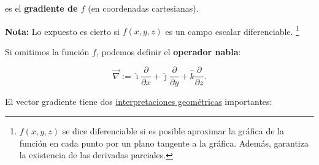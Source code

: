 es el \textbf{gradiente de $f$} (en coordenadas cartesianas).

\textbf{Nota:} Lo expuesto es cierto si $f(x,y,z)$ es un campo escalar diferenciable. \footnote{$f(x,y,z)$ se dice diferenciable si es posible aproximar la gráfica de la función en cada punto por un plano tangente a la gráfica. Además,  garantiza la existencia de las derivadas parciales.}

Si omitimos la función $f$, podemos definir el \textbf{operador nabla}:
\begin{shaded}
$$\vec{\nabla} :=  \hat{\imath} \frac{\partial}{\partial x} +  \hat{\jmath} \frac{\partial}{\partial y} +   \hat{k} \frac{\partial}{\partial z}.$$
\end{shaded}

El vector gradiente tiene dos \underline{interpretaciones geométricas} importantes:

